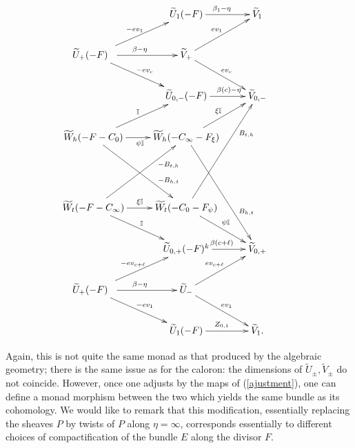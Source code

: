 \documentclass[12pt]{article}
\theoremstyle{definition}
\theoremstyle{remark}
\numberwithin{theorem}{section}
\def\bI{{\mathbb {I}}}
\begin{document}
   \begin{equation} \label{resolution-PQ-TN-10-twistor}\xymatrix{  
 & \widetilde U_1(-F)\ar[r]^{\beta_1-\eta} & \widetilde V_1\\
\widetilde U_+(-F) \ \  \ar[dr]^{-ev_c }\ar[r]^{\beta-\eta}\ar[ur]^{-ev_1 }& \widetilde V_+ \ar[dr]^{ev_c}\ar[ur]^{ev_1}\\ 
 & \widetilde U_{0,-}(-F)  \ar[r]^(0.6){\beta(c) -\eta} &\widetilde V_{0,-} \\ 
 \widetilde W_h(-F-C_0) \ar[ur]^{  \bI} \ar[ddr]^(0.7){-B_{h,t}}\ar[r]_(0.5){\psi\bI} & \widetilde  W_h(-C_\infty-F_\xi) \ar[ur]^{\xi\bI}  \ar[rddd]^(0.7){ B_{h,t}}  \\
 &&&\\
 \widetilde W_t(-F-C_\infty) \ar[dr]^{ \bI} \ar[uur]_(0.7){- B_{t,h}}\ar[r]^(0.5){\xi\bI} & \widetilde W_t(-C_0-F_\psi) \ar[dr]^{\psi\bI}  \ar[ruuu]_(0.7){ B_{t,h}}  \\
 & \widetilde U_{0,+}(-F)^{k }\ar[r]^{\beta(c+\ell)} & \widetilde V_{0,+}   \\
 \widetilde U_+(-F) \ \ \ar[dr]^{-ev_1 } \ar[r]^{\beta-\eta}\ar[ur]^{-ev_{c+\ell} }&    \widetilde U_-\ar[dr]^{ev_1}\ar[ur]^{ev_{c+\ell}}\\
 & \widetilde U_1(-F)\ar[r]^{Z_{ 0,1} } & \widetilde V_1.} \end{equation}
 
 Again, this is not quite the same monad  as that produced by the algebraic geometry; there is the same issue as for the caloron: the dimensions of $\widetilde  U_\pm, \widetilde  V_\pm$ do not coincide. However, once one adjusts by the maps of (\ref{ajustment}), one can define a monad morphism between the two which yields the same bundle as its cohomology. We would like to remark that this modification, essentially replacing the sheaves $P$ by twists of $P$ along $\eta =\infty$, corresponds essentially to different choices of compactification of 
 the bundle $E$ along the divisor $F$.
 
\end{document}
